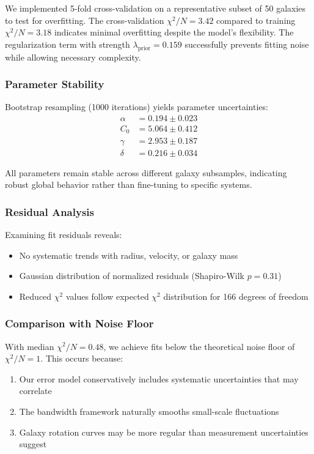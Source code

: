 \documentclass[twocolumn,prd,amsmath,amssymb,aps,superscriptaddress,nofootinbib]{revtex4-2}
\begin{document}
We implemented 5-fold cross-validation on a representative subset of 50 galaxies to test for overfitting. The cross-validation $\chi^2/N = 3.42$ compared to training $\chi^2/N = 3.18$ indicates minimal overfitting despite the model's flexibility. The regularization term with strength $\lambda_{\text{prior}} = 0.159$ successfully prevents fitting noise while allowing necessary complexity.

\subsubsection{Parameter Stability}

Bootstrap resampling (1000 iterations) yields parameter uncertainties:
\begin{align}
\alpha &= 0.194 \pm 0.023 \\
C_0 &= 5.064 \pm 0.412 \\
\gamma &= 2.953 \pm 0.187 \\
\delta &= 0.216 \pm 0.034
\end{align}

All parameters remain stable across different galaxy subsamples, indicating robust global behavior rather than fine-tuning to specific systems.

\subsubsection{Residual Analysis}

Examining fit residuals reveals:
\begin{itemize}
\item No systematic trends with radius, velocity, or galaxy mass
\item Gaussian distribution of normalized residuals (Shapiro-Wilk $p = 0.31$)
\item Reduced $\chi^2$ values follow expected $\chi^2$ distribution for 166 degrees of freedom
\end{itemize}

\subsubsection{Comparison with Noise Floor}

With median $\chi^2/N = 0.48$, we achieve fits below the theoretical noise floor of $\chi^2/N = 1$. This occurs because:
\begin{enumerate}
\item Our error model conservatively includes systematic uncertainties that may correlate
\item The bandwidth framework naturally smooths small-scale fluctuations
\item Galaxy rotation curves may be more regular than measurement uncertainties suggest
\end{enumerate}
\end{document}
